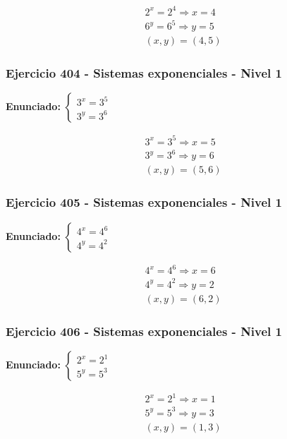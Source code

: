 \documentclass[12pt,a4paper]{article}
\begin{document}
\[
\begin{aligned}
2^x=2^{4}\Rightarrow x=4\\
6^y=6^{5}\Rightarrow y=5\\
\boxed{(x,y)=(4,5)}
\end{aligned}
\]


\subsubsection*{Ejercicio 404 - Sistemas exponenciales - Nivel 1}
\textbf{Enunciado:} \(\begin{cases} 3^x=3^{5}\\ 3^y=3^{6}\end{cases}\)

\[
\begin{aligned}
3^x=3^{5}\Rightarrow x=5\\
3^y=3^{6}\Rightarrow y=6\\
\boxed{(x,y)=(5,6)}
\end{aligned}
\]


\subsubsection*{Ejercicio 405 - Sistemas exponenciales - Nivel 1}
\textbf{Enunciado:} \(\begin{cases} 4^x=4^{6}\\ 4^y=4^{2}\end{cases}\)

\[
\begin{aligned}
4^x=4^{6}\Rightarrow x=6\\
4^y=4^{2}\Rightarrow y=2\\
\boxed{(x,y)=(6,2)}
\end{aligned}
\]


\subsubsection*{Ejercicio 406 - Sistemas exponenciales - Nivel 1}
\textbf{Enunciado:} \(\begin{cases} 2^x=2^{1}\\ 5^y=5^{3}\end{cases}\)

\[
\begin{aligned}
2^x=2^{1}\Rightarrow x=1\\
5^y=5^{3}\Rightarrow y=3\\
\boxed{(x,y)=(1,3)}
\end{aligned}
\]
\end{document}
